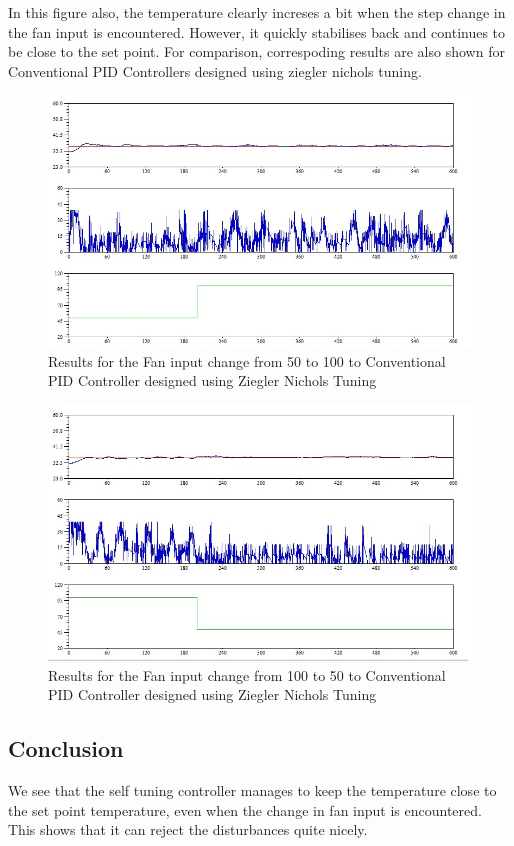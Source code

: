In this figure also, the temperature clearly increses a bit when the step change in the fan input is encountered. However, it quickly stabilises back and continues to be close to the set point.
\newpage
For comparison, correspoding results are also shown for Conventional PID Controllers designed using ziegler nichols tuning.
\begin{figure}[h]
	\centering
\includegraphics[width=.75\linewidth]{Vikas_self/report_tex/PID_results/Conventional_Tuning/Fan_disturbance/PID/step50to100.jpg}
	\caption{Results for the Fan input change from 50 to 100 to Conventional PID Controller designed using Ziegler Nichols Tuning}
	
\end{figure}

\begin{figure}[h]
	\centering
\includegraphics[width=.75\linewidth]{Vikas_self/report_tex/PID_results/Conventional_Tuning/Fan_disturbance/PID/step100to50.jpg}
	\caption{Results for the Fan input change from 100 to 50 to Conventional PID Controller designed using Ziegler Nichols Tuning}
	
\end{figure}

\subsection{Conclusion}
We see that the self tuning controller manages to keep the temperature close to the set point temperature, even when the change in fan input is encountered. This shows that it can reject the disturbances quite nicely.



